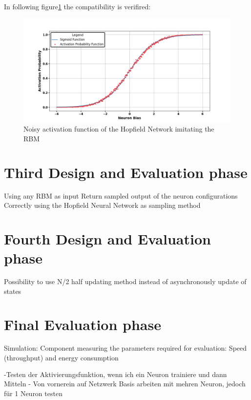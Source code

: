 In following figure\ref{Noisy_acitivation_function_good} the compatibility is verifired:
\begin{figure}[H]
    \centering
    \includegraphics[width=1\linewidth]{graphics/Noisy_HNN_2.png}
    \caption{Noisy activation function of the Hopfield Network imitating the \ac{RBM}}
    \label{Noisy_acitivation_function_good}
\end{figure}


\section{Third Design and Evaluation phase}

Using any \ac{RBM} as input
Return sampled output of the neuron configurations 
Correctly using the Hopfield Neural Network as sampling method 


\section{Fourth Design and Evaluation phase}

Possibility to use N/2 half updating method instead of asynchronously update of states

\section{Final Evaluation phase}

Simulation: Component measuring the parameters required for evaluation: Speed (throughput) and energy consumption


-Testen der Aktivierungsfunktion, wenn ich ein Neuron trainiere und dann Mitteln 
- Von vornerein auf Netzwerk Basis arbeiten mit mehren Neuron, jedoch für 1 Neuron testen



